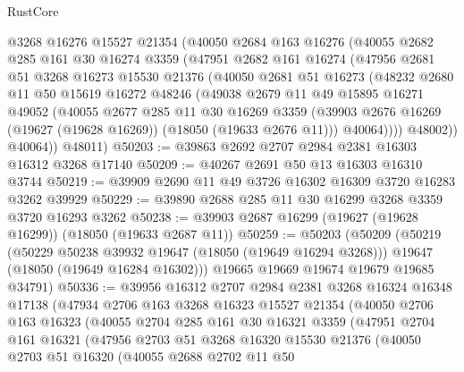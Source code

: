 \begin{lexlean}{RustCore}
\begin{coremodule}
      @3268
      @16276
      @15527
      @21354
      (@40050
        @2684
        @163
        @16276
        (@40055
          @2682
          @285
          @161
          @30
          @16274
          @3359
          (@47951
            @2682
            @161
            @16274
            (@47956
              @2681
              @51
              @3268
              @16273
              @15530
              @21376
              (@40050
                @2681
                @51
                @16273
                (@48232
                  @2680
                  @11
                  @50
                  @15619
                  @16272
                  @48246
                  (@49038
                    @2679
                    @11
                    @49
                    @15895
                    @16271
                    @49052
                    (@40055
                      @2677
                      @285
                      @11
                      @30
                      @16269
                      @3359
                      (@39903 @2676 @16269 (@19627 (@19628 @16269)) (@18050 (@19633 @2676 @11)))
                      @40064))))
              @48002))
          @40064))
      @48011)
@50203 := @39863 @2692 @2707 @2984 @2381 @16303 @16312 @3268 @17140
@50209 := @40267 @2691 @50 @13 @16303 @16310 @3744
@50219 := @39909 @2690 @11 @49 @3726 @16302 @16309 @3720 @16283 @3262 @39929
@50229 := @39890 @2688 @285 @11 @30 @16299 @3268 @3359 @3720 @16293 @3262
@50238 := @39903 @2687 @16299 (@19627 (@19628 @16299)) (@18050 (@19633 @2687 @11))
@50259 := @50203
    (@50209
      (@50219
        (@50229 @50238 @39932 @19647 (@18050 (@19649 @16294 @3268)))
        @19647
        (@18050 (@19649 @16284 @16302)))
      @19665
      @19669
      @19674
      @19679
      @19685
      @34791)
@50336 := @39956
    @16312
    @2707
    @2984
    @2381
    @3268
    @16324
    @16348
    @17138
    (@47934
      @2706
      @163
      @3268
      @16323
      @15527
      @21354
      (@40050
        @2706
        @163
        @16323
        (@40055
          @2704
          @285
          @161
          @30
          @16321
          @3359
          (@47951
            @2704
            @161
            @16321
            (@47956
              @2703
              @51
              @3268
              @16320
              @15530
              @21376
              (@40050
                @2703
                @51
                @16320
                (@40055
                  @2688
                  @2702
                  @11
                  @50

\end{coremodule}
\end{lexlean}
